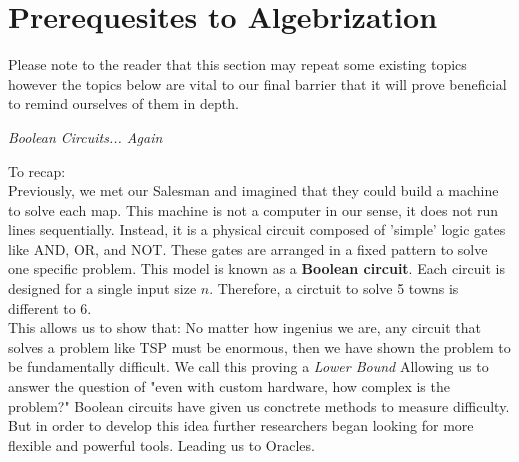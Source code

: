 \documentclass[12pt]{report}
\begin{document}
\section*{Prerequesites to Algebrization}
Please note to the reader that this section may repeat some existing topics however the topics below are vital to our final barrier that it will prove beneficial to remind ourselves of them in depth.

\begin{center}
    \vspace{0cm}
    {\Large\itshape Boolean Circuits... Again\par}
\end{center}
To recap:\\
Previously, we met our Salesman and imagined that they could build a machine to solve each map.
This machine is not a computer in our sense, it does not run lines sequentially.
Instead, it is a physical circuit composed of 'simple' logic gates like AND, OR, and NOT.
These gates are arranged in a fixed pattern to solve one specific problem.
This model is known as a \textbf{Boolean circuit}.
Each circuit is designed for a single input size $n$.
Therefore, a circtuit to solve 5 towns is different to 6.\\
This allows us to show that: No matter how ingenius we are, any circuit that solves a problem like TSP must be enormous, then we have shown the problem to be fundamentally difficult.
We call this proving a \textit{Lower Bound}
Allowing us to answer the question of "even with custom hardware, how complex is the problem?"
Boolean circuits have given us conctrete methods to measure difficulty.
But in order to develop this idea further researchers began looking for more flexible and powerful tools.
Leading us to Oracles.
\end{document}
